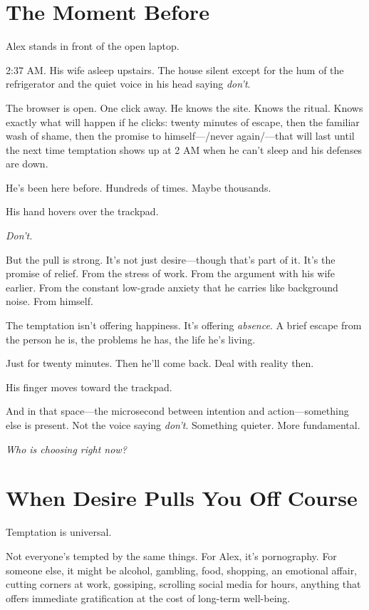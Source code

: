 \documentclass[11pt,twoside]{book}
\begin{document}
\section*{The Moment Before}

Alex stands in front of the open laptop.

2:37 AM. His wife asleep upstairs. The house silent except for the hum of the refrigerator and the quiet voice in his head saying \emph{don't}.

The browser is open. One click away. He knows the site. Knows the ritual. Knows exactly what will happen if he clicks: twenty minutes of escape, then the familiar wash of shame, then the promise to himself—/never again/—that will last until the next time temptation shows up at 2 AM when he can't sleep and his defenses are down.

He's been here before. Hundreds of times. Maybe thousands.

His hand hovers over the trackpad.

\emph{Don't.}

But the pull is strong. It's not just desire—though that's part of it. It's the promise of relief. From the stress of work. From the argument with his wife earlier. From the constant low-grade anxiety that he carries like background noise. From himself.

The temptation isn't offering happiness. It's offering \emph{absence}. A brief escape from the person he is, the problems he has, the life he's living.

Just for twenty minutes. Then he'll come back. Deal with reality then.

His finger moves toward the trackpad.

And in that space—the microsecond between intention and action—something else is present. Not the voice saying \emph{don't}. Something quieter. More fundamental.

\emph{Who is choosing right now?}

\section*{When Desire Pulls You Off Course}

Temptation is universal.

Not everyone's tempted by the same things. For Alex, it's pornography. For someone else, it might be alcohol, gambling, food, shopping, an emotional affair, cutting corners at work, gossiping, scrolling social media for hours, anything that offers immediate gratification at the cost of long-term well-being.
\end{document}
